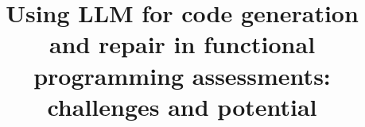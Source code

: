 \documentclass[sigconf,authordraft]{acmart}
\begin{document}
\title{Using LLM for code generation and repair in functional programming assessments: challenges and potential
}



\renewcommand{\shortauthors}{Trovato et al.}
\end{document}
